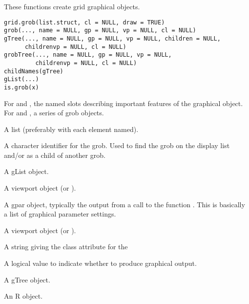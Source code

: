 %
\begin{Description}\relax
These functions create grid graphical objects.
\end{Description}
%
\begin{Usage}
\begin{verbatim}
grid.grob(list.struct, cl = NULL, draw = TRUE)
grob(..., name = NULL, gp = NULL, vp = NULL, cl = NULL)
gTree(..., name = NULL, gp = NULL, vp = NULL, children = NULL, 
      childrenvp = NULL, cl = NULL)
grobTree(..., name = NULL, gp = NULL, vp = NULL, 
         childrenvp = NULL, cl = NULL)
childNames(gTree)
gList(...)
is.grob(x)
\end{verbatim}
\end{Usage}
%
\begin{Arguments}
\begin{ldescription}
\item[\code{...}]  For  and , the
named slots describing important features of
the graphical object. For  and ,
a series of grob objects. 
\item[\code{list.struct}] A list (preferably with each element named).
\item[\code{name}]  A character identifier for the grob.  Used to find the
grob on the display list and/or as a child of another grob. 
\item[\code{children}]  A gList object. 
\item[\code{childrenvp}]  A viewport object (or ).
\item[\code{gp}] A gpar object, typically the output
from a call to the function .  This is basically
a list of graphical parameter settings.
\item[\code{vp}] A viewport object (or ).
\item[\code{cl}] A string giving the class attribute for the 
\item[\code{draw}] A logical value to indicate whether to produce
graphical output.
\item[\code{gTree}] A gTree object.
\item[\code{x}]  An R object. 
\end{ldescription}
\end{Arguments}
